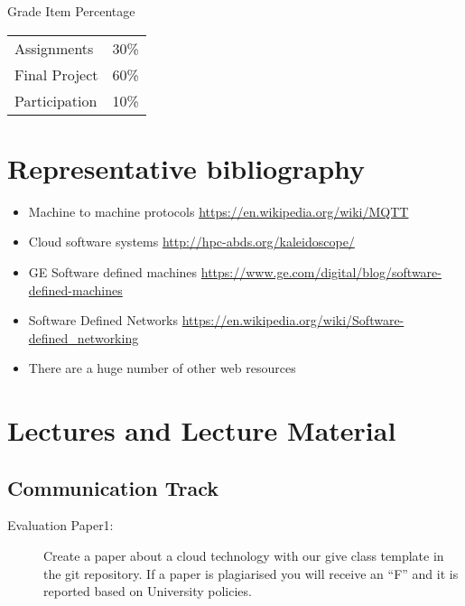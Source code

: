 Grade Item	Percentage
\begin{tabular}{lr}
Assignments	  & 30\% \\
Final Project	& 60\% \\
Participation	& 10\% \\
\end{tabular}



\section{Representative bibliography}

\begin{itemize}
\item	Machine to machine protocols \url{https://en.wikipedia.org/wiki/MQTT}
\item	Cloud software systems \url{http://hpc-abds.org/kaleidoscope/}
\item	GE Software defined machines \url{https://www.ge.com/digital/blog/software-defined-machines}
\item	Software Defined Networks \url{https://en.wikipedia.org/wiki/Software-defined_networking}
\item	There are a huge number of other web resources
\end{itemize}

\section{Lectures and Lecture Material}

\subsection{Communication Track}




\begin{description}
\item[Evaluation Paper1:] Create a paper about a cloud technology with our give
class template in the git repository. If a paper is plagiarised you
will receive an ``F'' and it is reported based on University
policies.
\end{description}


